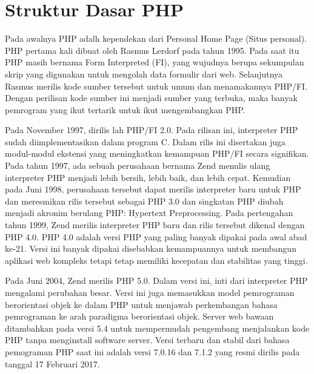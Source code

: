 \section{Struktur Dasar PHP}
Pada awalnya PHP adalh kependekan dari Personal Home Page (Situs personal). PHP pertama kali dibuat oleh Rasmus Lerdorf pada tahun 1995. Pada saat itu PHP masih bernama Form Interpreted (FI), yang wujudnya berupa sekumpulan skrip yang digunakan untuk mengolah data formulir dari web. Selanjutnya Rasmus merilis kode sumber tersebut untuk umum dan menamakannya PHP/FI. Dengan perilisan kode sumber ini menjadi sumber yang terbuka, maka banyak pemrogram yang ikut tertarik untuk ikut mengembangkan PHP.
\par
Pada November 1997, dirilis lah PHP/FI 2.0. Pada rilisan ini, interpreter PHP sudah diimplementasikan dalam program C. Dalam rilis ini disertakan juga modul-modul ekstensi yang meningkatkan kemampuan PHP/FI secara signifikan. Pada tahun 1997, ada sebuah perusahaan bernama Zend menulis ulang interpreter PHP menjadi lebih bersih, lebih baik, dan lebih cepat. Kemudian pada Juni 1998, perusahaan tersebut dapat merilis interpreter baru untuk PHP dan meresmikan rilis tersebut sebagai PHP 3.0 dan singkatan PHP diubah menjadi akronim berulang PHP: Hypertext Preprocessing. Pada pertengahan tahun 1999, Zend merilis interpreter PHP baru dan rilis tersebut dikenal dengan PHP 4.0. PHP 4.0 adalah versi PHP yang paling banyak dipakai pada awal abad ke-21. Versi ini banyak dipakai disebabkan kemampuannya untuk membangun aplikasi web kompleks tetapi tetap memiliki kecepatan dan stabilitas yang tinggi. 
\par
Pada Juni 2004, Zend merilis PHP 5.0. Dalam versi ini, inti dari interpreter PHP mengalami perubahan besar. Versi ini juga memasukkan model pemrograman berorientasi objek ke dalam PHP untuk menjawab perkembangan bahasa pemrograman ke arah paradigma berorientasi objek. Server web bawaan ditambahkan pada versi 5.4 untuk mempermudah pengembang menjalankan kode PHP tanpa menginstall software server. Versi terbaru dan stabil dari bahasa pemograman PHP saat ini adalah versi 7.0.16 dan 7.1.2 yang resmi dirilis pada tanggal 17 Februari 2017.

